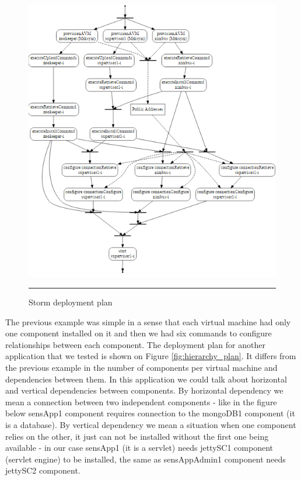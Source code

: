 \begin{figure}[htbp]
	\centering
		\includegraphics[width=38em]{./Figures/Storm_deployment_plan}
		\rule{38em}{0.5pt}
	\caption[Storm Deployment Plan]{Storm deployment plan}
	\label{fig:storm_deployment}
\end{figure}

\noindent 

\noindent The previous example was simple in a sense that each virtual machine had only one component installed on it and then we had six commands to configure relationships between each component. The deployment plan for another application that we tested is shown on Figure \ref{fig:hierarchy_plan}. It differs from the previous example in the number of components per virtual machine and dependencies between them. In this application we could talk about horizontal and vertical dependencies between components. By horizontal dependency we mean a connection between two independent components - like in the figure below sensApp1 component requires connection to the mongoDB1 component (it is a database). By vertical dependency we mean a situation when one component relies on the other, it just can not be installed without the first one being available - in our case sensApp1 (it is a servlet) needs jettySC1 component (servlet engine) to be installed, the same as sensAppAdmin1 component needs jettySC2 component.

